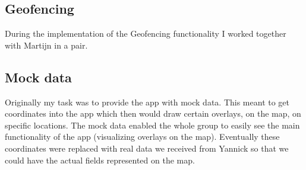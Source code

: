 \documentclass[12pt]{article}
\begin{document}
	\subsection{Geofencing}
	During the implementation of the Geofencing functionality I worked together with Martijn in a pair. 
	
	\subsection{Mock data}
	Originally my task was to provide the app with mock data. This meant to get coordinates into the app which then would draw certain overlays, on the map, on specific locations. The mock data enabled the whole group to easily see the main functionality of the app (visualizing overlays on the map). Eventually these coordinates were replaced with real data we received from Yannick so that we could have the actual fields represented on the map.
	
	
	
	
	
\end{document}
